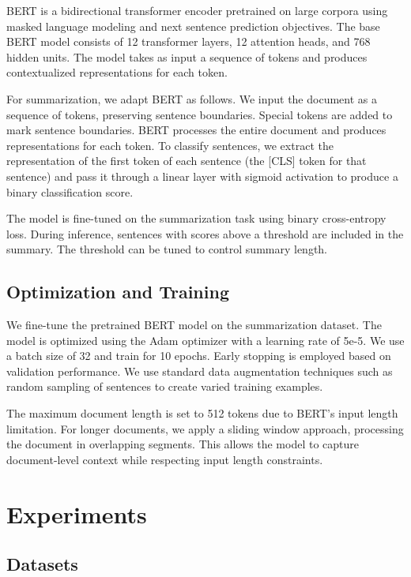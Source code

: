\documentclass[conference]{IEEEtran}
\begin{document}
BERT is a bidirectional transformer encoder pretrained on large corpora using masked language modeling and next sentence prediction objectives. The base BERT model consists of 12 transformer layers, 12 attention heads, and 768 hidden units. The model takes as input a sequence of tokens and produces contextualized representations for each token.

For summarization, we adapt BERT as follows. We input the document as a sequence of tokens, preserving sentence boundaries. Special tokens are added to mark sentence boundaries. BERT processes the entire document and produces representations for each token. To classify sentences, we extract the representation of the first token of each sentence (the [CLS] token for that sentence) and pass it through a linear layer with sigmoid activation to produce a binary classification score.

The model is fine-tuned on the summarization task using binary cross-entropy loss. During inference, sentences with scores above a threshold are included in the summary. The threshold can be tuned to control summary length.

\subsection{Optimization and Training}

We fine-tune the pretrained BERT model on the summarization dataset. The model is optimized using the Adam optimizer with a learning rate of 5e-5. We use a batch size of 32 and train for 10 epochs. Early stopping is employed based on validation performance. We use standard data augmentation techniques such as random sampling of sentences to create varied training examples.

The maximum document length is set to 512 tokens due to BERT's input length limitation. For longer documents, we apply a sliding window approach, processing the document in overlapping segments. This allows the model to capture document-level context while respecting input length constraints.

\section{Experiments}

\subsection{Datasets}
\end{document}
